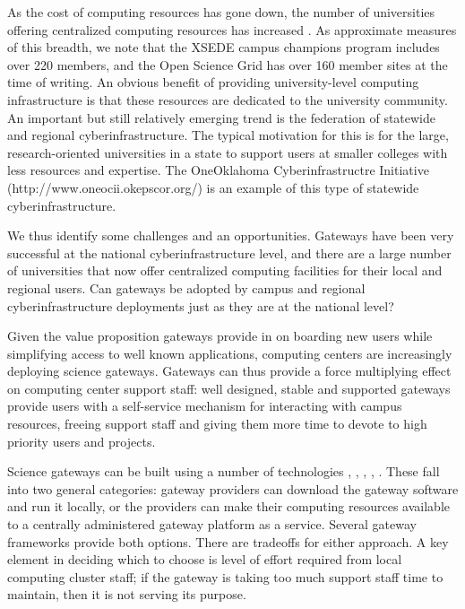 \documentclass[sigconf]{acmart}
\begin{document}
As the cost of computing resources has gone down, the number of universities offering centralized computing resources has increased \cite{hacker2007making}. As approximate measures of this breadth, we note that the XSEDE campus champions program includes over 220 members, and the Open Science Grid has over 160 member sites at the time of writing. An obvious benefit of providing university-level computing infrastructure is that these resources are dedicated to the university community. An important but still relatively emerging trend is the federation of statewide and regional cyberinfrastructure. The typical motivation for this is for the large, research-oriented universities in a state to support users at smaller colleges with less resources and expertise. The OneOklahoma Cyberinfrastructre Initiative (http://www.oneocii.okepscor.org/) is an example of this type of statewide cyberinfrastructure.

We thus identify some challenges and an opportunities. Gateways have been very successful at the national cyberinfrastructure level, and there are a large number of universities that now offer centralized computing facilities for their local and regional users. Can gateways be adopted by campus and regional cyberinfrastructure deployments just as they are at the national level?

Given the value proposition gateways provide in on boarding new users while simplifying access to well known applications, computing centers are increasingly deploying science gateways.  Gateways can thus provide a force multiplying effect on computing center support staff: well designed, stable and supported gateways provide users with a self-service mechanism for interacting with campus resources, freeing support staff and giving them more time to devote to high priority users and projects.

Science gateways can be built using a number of technologies \cite{mclennan2010hubzero}, \cite{dooley2012software}, \cite{marru2011apache}, \cite{goecks2010galaxy}, \cite{kluyver2016jupyter}.  These fall into two general categories: gateway providers can download the gateway software and run it locally, or the providers can make their computing resources available to a centrally administered gateway platform as a service. Several gateway frameworks provide both options.  There are tradeoffs for either approach. A key element in deciding which to choose is level of effort required from local computing cluster staff; if the gateway is taking too much support staff time to maintain, then it is not serving its purpose.
\end{document}
